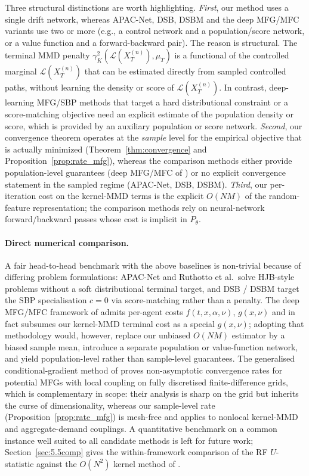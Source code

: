 \documentclass[11pt,leqno]{article}
\theoremstyle{plain}
\theoremstyle{remark}
\theoremstyle{definition}
\numberwithin{equation}{section}
\numberwithin{figure}{section}
\numberwithin{table}{section}
\numberwithin{algorithm}{section}
\begin{document}
Three structural distinctions are worth highlighting.
\emph{First}, our method uses a single drift network, whereas APAC-Net, DSB, DSBM and the deep MFG/MFC variants use two or more (e.g., a control network and a population/score network, or a value function and a forward-backward pair).
The reason is structural.
The terminal MMD penalty $\gamma_K^2(\mathcal{L}(X_T^{(n)}),\mu_T)$ is a functional of the controlled marginal $\mathcal{L}(X_T^{(n)})$
that can be estimated directly from sampled controlled paths,
without learning the density or score of $\mathcal{L}(X_T^{(n)})$.
In contrast, deep-learning MFG/SBP methods that target a hard distributional constraint or a score-matching objective
need an explicit estimate of the population density or score,
which is provided by an auxiliary population or score network.
\emph{Second}, our convergence theorem operates at the \emph{sample} level for the empirical objective that is actually minimized
(Theorem~\ref{thm:convergence} and Proposition~\ref{prop:rate_mfg}),
whereas the comparison methods either provide population-level guarantees (deep MFG/MFC of \cite{car-lau:2022}) or no explicit convergence statement in the sampled regime (APAC-Net, DSB, DSBM).
\emph{Third}, our per-iteration cost on the kernel-MMD terms is the explicit $O(NM)$ of the random-feature representation;
the comparison methods rely on neural-network forward/backward passes whose cost is implicit in $P_\theta$.

\paragraph{Direct numerical comparison.}
A fair head-to-head benchmark with the above baselines is non-trivial because of differing problem formulations:
APAC-Net and Ruthotto et al.\ solve HJB-style problems without a soft distributional terminal target,
and DSB / DSBM target the SBP specialisation $c=0$ via score-matching rather than a penalty.
The deep MFG/MFC framework of \cite{car-lau:2022,car-lau:2021} admits per-agent costs $f(t,x,\alpha,\nu)$, $g(x,\nu)$
and in fact subsumes our kernel-MMD terminal cost as a special $g(x,\nu)$;
adopting that methodology would, however, replace our unbiased $O(NM)$ estimator
by a biased sample mean, introduce a separate population or value-function network,
and yield population-level rather than sample-level guarantees.
The generalised conditional-gradient method of \cite{nakam-sai:2026loc,nakam-sai:2026disc}
proves non-asymptotic convergence rates for potential MFGs with local coupling
on fully discretised finite-difference grids, which is complementary in scope:
their analysis is sharp on the grid but inherits the curse of dimensionality,
whereas our sample-level rate (Proposition~\ref{prop:rate_mfg}) is mesh-free
and applies to nonlocal kernel-MMD and aggregate-demand couplings.
A quantitative benchmark on a common instance well suited to all candidate methods is left for future work;
Section~\ref{sec:5.5comp} gives the within-framework comparison of the RF $U$-statistic against the $O(N^2)$ kernel method of \cite{nak:2024sb}.
\end{document}
